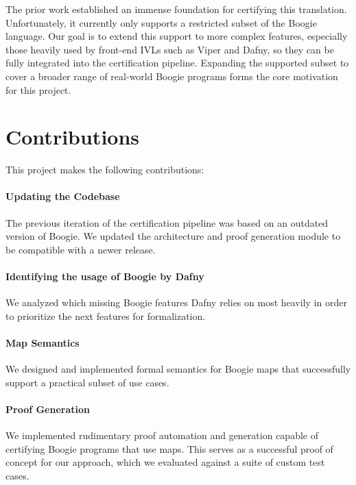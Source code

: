 The prior work established an immense foundation for certifying this translation.
Unfortunately, it currently only supports a restricted subset of the Boogie language.
Our goal is to extend this support to more complex features,
especially those heavily used by front-end IVLs such as Viper and Dafny,
so they can be fully integrated into the certification pipeline.
Expanding the supported subset to cover a broader range of real-world Boogie programs forms the core motivation for this project.


\section{Contributions}

This project makes the following contributions:

\paragraph{Updating the Codebase} The previous iteration of the certification pipeline was based on an outdated version of Boogie.
We updated the architecture and proof generation module to be compatible with a newer release.

\paragraph{Identifying the usage of Boogie by Dafny} We analyzed which missing Boogie features Dafny relies on most heavily in order to prioritize the next features for formalization.

\paragraph{Map Semantics} We designed and implemented formal semantics for Boogie maps that successfully support a practical subset of use cases.

\paragraph{Proof Generation} We implemented rudimentary proof automation and generation capable of certifying Boogie programs that use maps. 
This serves as a successful proof of concept for our approach, which we evaluated against a suite of custom test cases.


